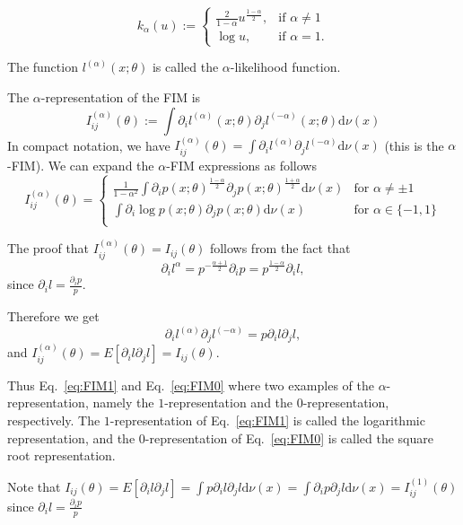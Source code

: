 \documentclass[11pt]{article}
\def\eqdef{:=}
\def\dnu{\mathrm{d}\nu}
\begin{document}
\begin{equation}\label{eq:alphaembedding}
k_\alpha(u) \eqdef \left\{
\begin{array}{ll}
\frac{2}{1-\alpha}u^{\frac{1-\alpha}{2}}, & \mbox{if $\alpha\not=1$}\\
\log u, & \mbox{if $\alpha=1$}.
\end{array}
\right.
\end{equation}

The function $l^{(\alpha)}(x;\theta)$ is called the $\alpha$-likelihood function.

The $\alpha$-representation of the FIM is
\begin{equation}\label{eq:FIMalpha}
\boxed{I_{ij}^{(\alpha)}(\theta) \eqdef \int \partial_i l^{(\alpha)}(x;\theta)\partial_j l^{(-\alpha)}(x;\theta) \dnu(x)}
\end{equation}
In compact notation, we have $I_{ij}^{(\alpha)}(\theta)=\int  \partial_i l^{(\alpha)}\partial_j l^{(-\alpha)} \dnu(x)$ (this is the $\alpha$-FIM).
We can expand the $\alpha$-FIM expressions as follows
$$
I_{ij}^{(\alpha)}(\theta) = \left\{
\begin{array}{ll}
\frac{1}{1-\alpha^2}\int \partial_i p(x;\theta)^{\frac{1-\alpha}{2}}  \partial_j p(x;\theta)^{\frac{1+\alpha}{2}} \dnu(x) & \mbox{for $\alpha\not =\pm1$}\\
\int \partial_i \log p(x;\theta) \partial_j p(x;\theta) \dnu(x) & \mbox{for $\alpha\in \{-1,1\}$}\\
\end{array}
\right.
$$


The proof that $I_{ij}^{(\alpha)}(\theta)=I_{ij}(\theta)$ follows from the fact that
$$
\partial_i l^{\alpha} =  p^{-\frac{\alpha+1}{2}}\partial_i p = p^{\frac{1-\alpha}{2}}\partial_i l,
$$
since $\partial_i l=\frac{\partial_i p}{p}$.

Therefore we get
$$
\partial_i l^{(\alpha)}\partial_j l^{(-\alpha)}=p\partial_i l\partial_j l,
$$
and $I_{ij}^{(\alpha)}(\theta)=E[\partial_i l\partial_j l]=I_{ij}(\theta)$.

Thus Eq.~\ref{eq:FIM1} and Eq.~\ref{eq:FIM0} where two examples of the $\alpha$-representation, namely the $1$-representation and the $0$-representation, respectively. The $1$-representation of Eq.~\ref{eq:FIM1} is called the logarithmic representation, and the  $0$-representation of Eq.~\ref{eq:FIM0} 
is called the square root representation.

Note that $I_{ij}(\theta)=E[\partial_i l\partial_j l]=\int p\partial_i l\partial_j l\dnu(x)=\int \partial_i p\partial_j l\dnu(x)=I_{ij}^{(1)}(\theta)$ since $\partial_i l=\frac{\partial_i p}{p}$
\end{document}

